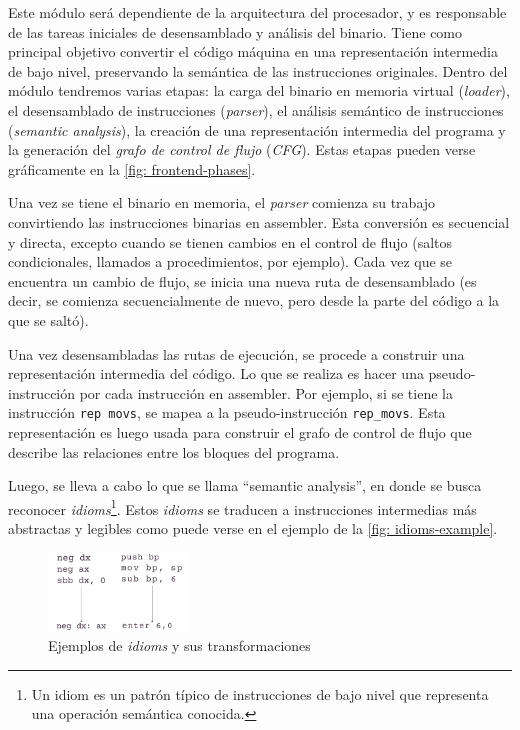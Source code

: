 \documentclass[runningheads]{llncs}
\begin{document}
Este módulo será dependiente de la arquitectura del procesador, y es responsable de las tareas iniciales 
de desensamblado y análisis del binario. Tiene como principal objetivo convertir el código máquina en 
una representación intermedia de bajo nivel, preservando la semántica de las instrucciones originales.
Dentro del módulo tendremos varias etapas: la carga del binario en memoria virtual (\textit{loader}),
el desensamblado de instrucciones (\textit{parser}), el análisis semántico de instrucciones
(\textit{semantic analysis}), la creación de una representación intermedia del programa y la generación
del \textit{grafo de control de flujo} (\textit{CFG}). Estas etapas pueden verse gráficamente 
en la \autoref{fig: frontend-phases}.

Una vez se tiene el binario en memoria, el \textit{parser} comienza su trabajo convirtiendo las
instrucciones binarias en assembler. Esta conversión es secuencial y directa, excepto cuando se tienen
cambios en el control de flujo (saltos condicionales, llamados a procedimientos, por ejemplo). Cada vez
que se encuentra un cambio de flujo, se inicia una nueva ruta de desensamblado (es decir, se comienza
secuencialmente de nuevo, pero desde la parte del código a la que se saltó). 

Una vez desensambladas las rutas de ejecución, se procede a construir una representación intermedia
del código. Lo que se realiza es hacer una pseudo-instrucción por cada instrucción en assembler.
Por ejemplo, si se tiene la instrucción \verb|rep movs|, se mapea a la pseudo-instrucción
\verb|rep_movs|. Esta representación es luego usada para construir el grafo de control de flujo
que describe las relaciones entre los bloques del programa.

Luego, se lleva a cabo lo que se llama “semantic analysis”, en donde se busca reconocer 
\textit{idioms}\footnote{Un idiom es un patrón típico de instrucciones de bajo nivel que representa una 
operación semántica conocida.}. Estos \textit{idioms} se traducen a instrucciones intermedias más 
abstractas y legibles como puede verse en el ejemplo de la \autoref{fig: idioms-example}.

\begin{figure}
  \centering
  \includegraphics[width=0.33\textwidth]{idioms-example.png}
  \caption{Ejemplos de \textit{idioms} y sus transformaciones}
  \label{fig: idioms-example}
  \vspace{-15pt}
\end{figure}
\end{document}
